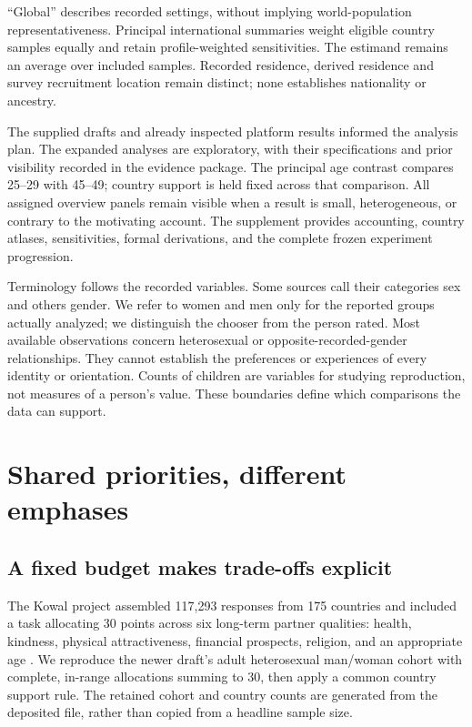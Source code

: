 ``Global'' describes recorded settings, without implying world-population representativeness. Principal international summaries weight eligible country samples equally and retain profile-weighted sensitivities. The estimand remains an average over included samples. Recorded residence, derived residence and survey recruitment location remain distinct; none establishes nationality or ancestry.

The supplied drafts and already inspected platform results informed the analysis plan. The expanded analyses are exploratory, with their specifications and prior visibility recorded in the evidence package. The principal age contrast compares 25--29 with 45--49; country support is held fixed across that comparison. All assigned overview panels remain visible when a result is small, heterogeneous, or contrary to the motivating account. The supplement provides accounting, country atlases, sensitivities, formal derivations, and the complete frozen experiment progression.

Terminology follows the recorded variables. Some sources call their categories sex and others gender. We refer to women and men only for the reported groups actually analyzed; we distinguish the chooser from the person rated. Most available observations concern heterosexual or opposite-recorded-gender relationships. They cannot establish the preferences or experiences of every identity or orientation. Counts of children are variables for studying reproduction, not measures of a person's value. These boundaries define which comparisons the data can support.

\section{Shared priorities, different emphases}\label{sec:minds-priorities}

\subsection{A fixed budget makes trade-offs explicit}

The Kowal project assembled 117,293 responses from 175 countries and included a task allocating 30 points across six long-term partner qualities: health, kindness, physical attractiveness, financial prospects, religion, and an appropriate age \citep{kowal2025,kowaldata}. We reproduce the newer draft's adult heterosexual man/woman cohort with complete, in-range allocations summing to 30, then apply a common country support rule. The retained cohort and country counts are generated from the deposited file, rather than copied from a headline sample size.

